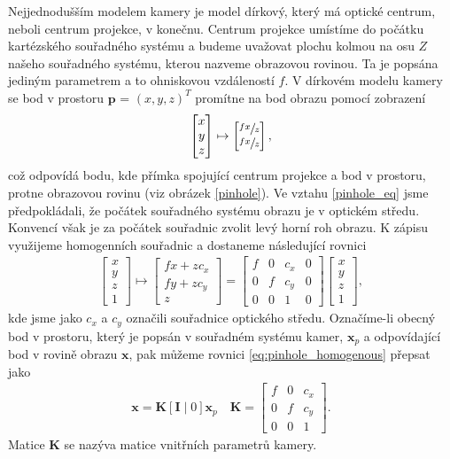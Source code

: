 \documentclass[twoside]{ctuthesis}
\newcommand{\tl}[1]{$\mathbf{#1}$}
\begin{document}
Nejjednodušším modelem kamery je model dírkový, který má optické centrum, neboli centrum projekce, v konečnu. Centrum projekce umístíme do počátku kartézského souřadného systému a budeme uvažovat plochu kolmou na osu $Z$ našeho souřadného systému, kterou nazveme obrazovou rovinou. Ta je popsána jediným parametrem a to ohniskovou vzdáleností $f$. V dírkovém modelu kamery se bod v prostoru \tl{p} = $(x,y,z)^T$ promítne na bod obrazu pomocí zobrazení
\begin{align}
    \begin{bmatrix} x \\ y \\ z \end{bmatrix} \mapsto \begin{bmatrix} \sfrac{fx}{z} \\ \sfrac{fx}{z} \end{bmatrix},
    \label{pinhole_eq}
\end{align}
což odpovídá bodu, kde přímka spojující centrum projekce a bod v prostoru, protne obrazovou rovinu (viz obrázek \ref{pinhole}). Ve vztahu \ref{pinhole_eq} jsme předpokládali, že počátek souřadného systému obrazu je v optickém středu. Konvencí však je za počátek souřadnic zvolit levý horní roh obrazu. K zápisu využijeme homogenních souřadnic a dostaneme následující rovnici 
\begin{align}
    \begin{bmatrix} x \\ y \\ z \\ 1 \end{bmatrix} \mapsto \begin{bmatrix} fx + zc_x \\ fy + zc_y \\ z \end{bmatrix} = \begin{bmatrix} f & 0 & c_x & 0 \\ 0 & f & c_y & 0 \\ 0 & 0 & 1 &0 \end{bmatrix} \begin{bmatrix} x \\ y \\ z \\ 1 \end{bmatrix},
    \label{eq:pinhole_homogenous}
\end{align}
kde jsme jako $c_x$ a $c_y$ označili souřadnice optického středu. Označíme-li obecný bod v prostoru, který je popsán v souřadném systému kamer, \tl{x}$_p$ a odpovídající bod v rovině obrazu \tl{x}, pak můžeme rovnici \ref{eq:pinhole_homogenous} přepsat jako
\begin{align}
    \mathbf{x} = \mathbf{K}[\mathbf{I}\; |\; 0 ]\mathbf{x}_p \quad \mathbf{K} = \begin{bmatrix} f & 0 & c_x  \\ 0 & f & c_y  \\ 0 & 0 & 1  \end{bmatrix}.
    \label{intrinstic}
\end{align}
Matice \tl{K} se nazýva matice vnitřních parametrů kamery.
\end{document}

